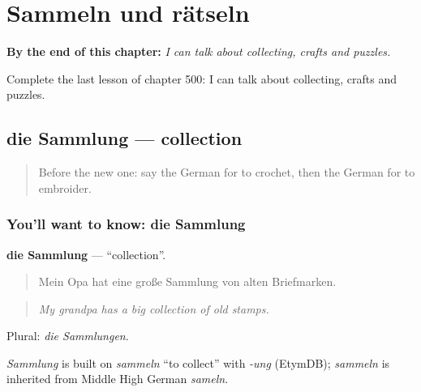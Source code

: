 
\chapter{Sammeln und rätseln}
\label{ch:ge-sammeln-und-ratseln}

\begin{chapteropening}
\textbf{By the end of this chapter:} \emph{I can talk about collecting, crafts and puzzles.}

Complete the last lesson of chapter 500: I can talk about collecting, crafts and puzzles.
\end{chapteropening}

\section[die Sammlung]{die Sammlung — collection}

\label{lesson:GE-C500-sammlung}



\begin{quote}
Before the new one: say the German for to crochet, then the German for to embroider.
\end{quote}

\subsection*{You'll want to know: die Sammlung}
\textbf{die Sammlung} — \textquotedblleft{}collection\textquotedblright{}.

\begin{quote}
Mein Opa hat eine große Sammlung von alten Briefmarken.
\end{quote}

\begin{quote}
\emph{My grandpa has a big collection of old stamps.}
\end{quote}

Plural: \emph{die Sammlungen}.

\begin{cousinweb}
\emph{Sammlung} is built on \emph{sammeln} \textquotedblleft{}to collect\textquotedblright{} with \emph{-ung} (EtymDB); \emph{sammeln} is inherited from Middle High German \emph{sameln}.
\end{cousinweb}

